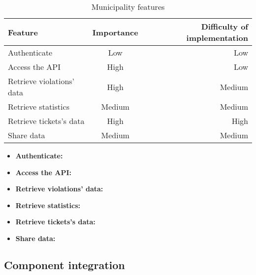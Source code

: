         \begin{table}[h!]
            \begin{center}
            
            \begin{tabular}{l|c|r} %
                \textbf{Feature} & \textbf{Importance} & \textbf{Difficulty of implementation}\\
                
                \hline
                Authenticate & Low & Low\\
                Access the API & High & Low\\
                Retrieve violations' data & High & Medium\\
                Retrieve statistics & Medium & Medium\\
                Retrieve tickets's data & High & High\\
                Share data & Medium & Medium\\

            \end{tabular}
            \caption{Municipality features}
            \label{tab:table1}
            \end{center}
        \end{table}

        \begin{itemize}
            \item \textbf{Authenticate:} 
            \item \textbf{Access the API:}
            \item \textbf{Retrieve violations' data:}
            \item \textbf{Retrieve statistics:}
            \item \textbf{Retrieve tickets's data:}
            \item \textbf{Share data:}
        \end{itemize}

    \subsection{Component integration}

